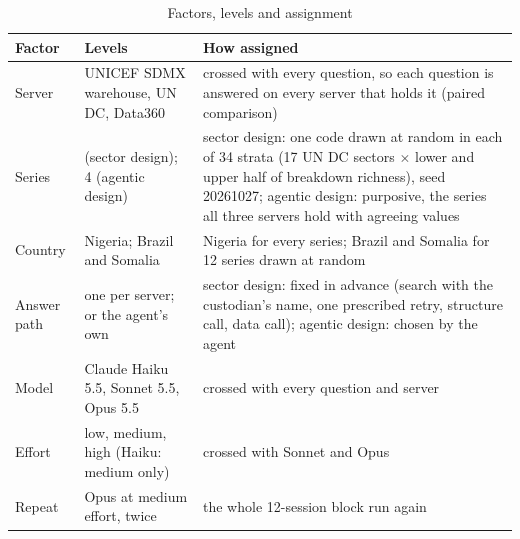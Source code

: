 \documentclass[11pt,a4paper]{article}
\begin{document}
\begin{table}[htbp]\centering\small
\caption{Factors, levels and assignment}\label{tab:factors}
\begin{tabularx}{\textwidth}{@{}>{\raggedright\arraybackslash}p{2.0cm}>{\raggedright\arraybackslash}p{4.3cm}L@{}}
\toprule
Factor & Levels & How assigned \\ \midrule
Server & UNICEF SDMX warehouse, UN DC, Data360 & crossed with every question, so each question is answered on every server that holds it (paired comparison) \\
Series & \nSeries{} (sector design); 4 (agentic design) & sector design: one code drawn at random in each of 34 strata (17 UN DC sectors $\times$ lower and upper half of breakdown richness), seed 20261027; agentic design: purposive, the series all three servers hold with agreeing values \\
Country & Nigeria; Brazil and Somalia & Nigeria for every series; Brazil and Somalia for 12 series drawn at random \\
Answer path & one per server; or the agent's own & sector design: fixed in advance (search with the custodian's name, one prescribed retry, structure call, data call); agentic design: chosen by the agent \\
Model & Claude Haiku 5.5, Sonnet 5.5, Opus 5.5 & crossed with every question and server \\
Effort & low, medium, high (Haiku: medium only) & crossed with Sonnet and Opus \\
Repeat & Opus at medium effort, twice & the whole 12-session block run again \\
\bottomrule
\end{tabularx}
\end{table}
\end{document}
